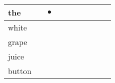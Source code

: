 \documentclass[landscape]{article}
\newcommand{\ssp}{\hspace{2pt}}
\newcommand{\mex}{\cellcolor{g}$\bullet$}
\begin{document}
\begin{tabular}{|l|p{10pt}|p{10pt}|p{10pt}|p{10pt}|p{10pt}|p{10pt}|p{10pt}|p{10pt}|p{10pt}|}
\hline
\ssp \cellcolor{ref1}the \ssp&\hspace{2pt}&\hspace{2pt}\mex&\hspace{2pt}&\hspace{2pt}&\hspace{2pt}&\hspace{2pt}&\hspace{2pt}&\hspace{2pt}&\hspace{2pt}\\
\hline
\ssp white \ssp&\hspace{2pt}&\hspace{2pt}&\hspace{2pt}&\hspace{2pt}&\hspace{2pt}&\hspace{2pt}&\hspace{2pt}&\hspace{2pt}&\hspace{2pt}\\
\hline
\ssp grape \ssp&\hspace{2pt}&\hspace{2pt}&\hspace{2pt}&\hspace{2pt}&\hspace{2pt}&\hspace{2pt}&\hspace{2pt}&\hspace{2pt}&\hspace{2pt}\\
\hline
\ssp juice \ssp&\hspace{2pt}&\hspace{2pt}&\hspace{2pt}&\hspace{2pt}&\hspace{2pt}&\hspace{2pt}&\hspace{2pt}&\hspace{2pt}&\hspace{2pt}\\
\hline
\ssp button \ssp&\hspace{2pt}&\hspace{2pt}&\hspace{2pt}&\hspace{2pt}&\hspace{2pt}&\hspace{2pt}&\hspace{2pt}&\hspace{2pt}&\hspace{2pt}\\

\end{tabular}
\end{document}
